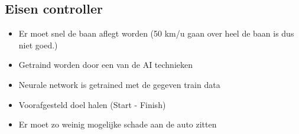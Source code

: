\documentclass{article}
\begin{document}
\subsection*{Eisen controller}
\begin{itemize}
\item Er moet snel de baan aflegt worden (50 km/u gaan over heel de baan is dus niet goed.)
\item Getraind worden door een van de AI technieken
\item Neurale network is getrained met de gegeven train data
\item Voorafgesteld doel halen (Start - Finish)
\item Er moet zo weinig mogelijke schade aan de auto zitten
\end{itemize}

\pagebreak
\end{document}
